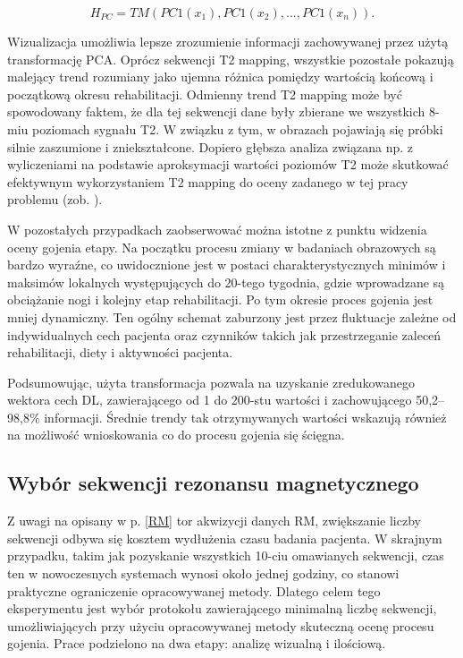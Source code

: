 \begin{equation}
\label{ecq:HPC}
H_{PC} = TM(PC1(x_1), PC1(x_2),..., PC1(x_n)).
\end{equation}

Wizualizacja umożliwia lepsze zrozumienie informacji zachowywanej przez użytą transformację PCA. Oprócz sekwencji T2 mapping, wszystkie pozostałe pokazują malejący trend rozumiany jako ujemna różnica pomiędzy wartością końcową i początkową okresu rehabilitacji. Odmienny trend T2 mapping może być spowodowany faktem, że dla tej sekwencji dane były zbierane we wszystkich 8-miu poziomach sygnału T2. W związku z tym, w obrazach pojawiają się próbki silnie zaszumione \linebreak i zniekształcone. Dopiero głębsza analiza związana np. z wyliczeniami na podstawie aproksymacji wartości poziomów T2 może skutkować efektywnym wykorzystaniem T2 mapping do oceny zadanego w tej pracy problemu (zob. \cite{Regulski2017}). 

W pozostałych przypadkach zaobserwować można istotne z punktu widzenia oceny gojenia etapy. Na początku procesu zmiany w badaniach obrazowych są bardzo wyraźne, co uwidocznione jest w postaci charakterystycznych minimów i maksimów lokalnych występujących do 20-tego tygodnia, gdzie wprowadzane są obciążanie nogi i kolejny etap rehabilitacji. Po tym okresie proces gojenia jest mniej dynamiczny. Ten ogólny schemat zaburzony jest przez fluktuacje zależne od indywidualnych cech pacjenta oraz czynników takich jak przestrzeganie zaleceń rehabilitacji, diety i aktywności pacjenta. 

Podsumowując, użyta transformacja pozwala na uzyskanie zredukowanego wektora cech DL, zawierającego od 1 do 200-stu wartości i zachowującego 50,2--98,8\% informacji. Średnie trendy tak otrzymywanych wartości wskazują również na możliwość wnioskowania co do procesu gojenia się ścięgna.  


\subsection{Wybór sekwencji rezonansu magnetycznego}
\label{seq:protocol_selection}
Z uwagi na opisany w p. \ref{RM} tor akwizycji danych RM, zwiększanie liczby sekwencji odbywa się kosztem wydłużenia czasu badania pacjenta. W skrajnym przypadku, takim jak pozyskanie wszystkich 10-ciu omawianych sekwencji, czas ten w nowoczesnych systemach wynosi około jednej godziny, co stanowi praktyczne ograniczenie opracowywanej metody. Dlatego celem tego eksperymentu jest wybór protokołu zawierającego minimalną liczbę sekwencji, umożliwiających przy użyciu opracowywanej metody skuteczną ocenę procesu gojenia. Prace podzielono na dwa etapy: analizę wizualną i ilościową.

